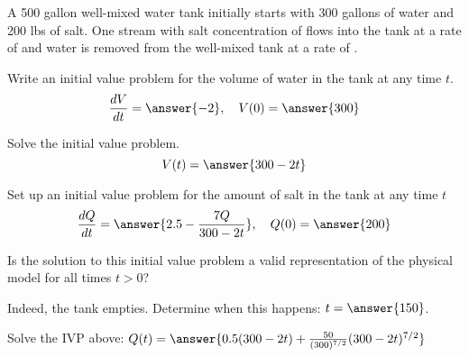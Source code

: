\documentclass{ximera}
\begin{document}

\begin{exercise}
    A 500 gallon well-mixed water tank initially starts with 300 gallons of water and 200 lbs of salt. One stream with salt concentration of  flows into the tank at a rate of  and water is removed from the well-mixed tank at a rate of .
    
    Write an initial value problem for the volume of water in the tank at any time $t$.
    \[
        \frac{dV}{dt} = \answer{-2}, \quad V(0) = \answer{300}
    \]
    \begin{problem}
        Solve the initial value problem.
        \[
            V(t) = \answer{300-2t} 
        \]
        \begin{problem}
            Set up an initial value problem for the amount of salt in the tank at any time $t$
            \[
                \frac{dQ}{dt} = \answer{2.5 - \frac{7Q}{300-2t}}, \quad Q(0) = \answer{200}
            \]
            \begin{problem}
                Is the solution to this initial value problem a valid representation of the physical model for all times $t > 0$?
                \begin{multipleChoice}
                \end{multipleChoice}
                \begin{problem}
                    Indeed, the tank empties. Determine when this happens: $t = \answer{150}$.
                    \begin{problem}
                        Solve the IVP above: $Q(t) = \answer{0.5(300-2t) + \frac{50}{(300)^{7/2}}(300-2t)^{7/2}}$
                    \end{problem}
                \end{problem}
            \end{problem}
        \end{problem}
    \end{problem}
    
\end{exercise}
\end{document}
